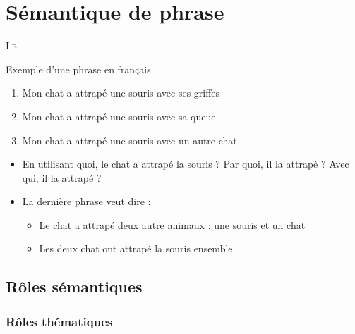 \documentclass{KodeBook}
\begin{document}
		\mainmatter
	
\fi
\chapter{Sémantique de phrase}

\begin{introduction}
	\lettrine{L}{e} 
\end{introduction} 

\begin{exampleblock}{Exemple d'une phrase en français}
	\begin{center}
		\Large\bfseries
		\begin{enumerate}
			\item Mon chat a attrapé une souris avec ses griffes 
			\item Mon chat a attrapé une souris avec sa queue
			\item Mon chat a attrapé une souris avec un autre chat
		\end{enumerate}
	\end{center}
\end{exampleblock}

\begin{itemize}
	\item En utilisant quoi, le chat a attrapé la souris ? Par quoi, il la attrapé ? Avec qui, il la attrapé ?
	\item La dernière phrase veut dire : 
	\begin{itemize}
		\item Le chat a attrapé deux autre animaux : une souris et un chat
		\item Les deux chat ont attrapé la souris ensemble
	\end{itemize}
\end{itemize}


\section{Rôles sémantiques}

\subsection{Rôles thématiques}
\end{document}
